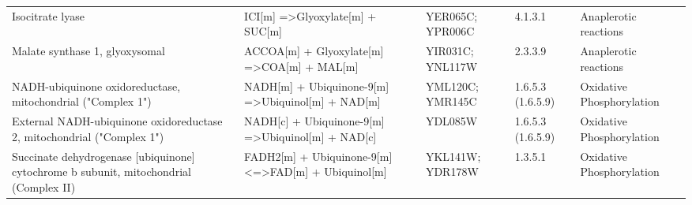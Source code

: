 {\begin{landscape}
\begin{longtable}{p{.25\linewidth} | p{.40\linewidth} | p{.19\linewidth} | p{.05\linewidth} | p{.10\linewidth}}
Isocitrate lyase                                                                          & ICI{[}m{]} =\textgreater Glyoxylate{[}m{]} + SUC{[}m{]}                                                                                         & YER065C; YPR006C                                                                                                                                                 & 4.1.3.1            & Anaplerotic reactions                                                       \\
Malate synthase 1, glyoxysomal                                                            & ACCOA{[}m{]} + Glyoxylate{[}m{]} =\textgreater COA{[}m{]} + MAL{[}m{]}                                                                          & YIR031C; YNL117W                                                                                                                                                 & 2.3.3.9            & Anaplerotic reactions                                                       \\
NADH-ubiquinone oxidoreductase, mitochondrial ("Complex 1")                               & NADH{[}m{]} + Ubiquinone-9{[}m{]} =\textgreater Ubiquinol{[}m{]} + NAD{[}m{]}                                                                   & YML120C; YMR145C                                                                                                                                                 & 1.6.5.3 (1.6.5.9)  & Oxidative Phosphorylation                                                   \\
External NADH-ubiquinone oxidoreductase 2, mitochondrial ("Complex 1")                    & NADH{[}c{]} + Ubiquinone-9{[}m{]} =\textgreater Ubiquinol{[}m{]} + NAD{[}c{]}                                                                   & YDL085W                                                                                                                                                          & 1.6.5.3 (1.6.5.9)  & Oxidative Phosphorylation                                                   \\
Succinate dehydrogenase {[}ubiquinone{]} cytochrome b subunit, mitochondrial (Complex II) & FADH2{[}m{]} + Ubiquinone-9{[}m{]} \textless{}=\textgreater FAD{[}m{]} + Ubiquinol{[}m{]}                                                       & YKL141W; YDR178W                                                                                                                                                 & 1.3.5.1            & Oxidative Phosphorylation                                                   \\

\end{longtable}
\end{landscape}}
